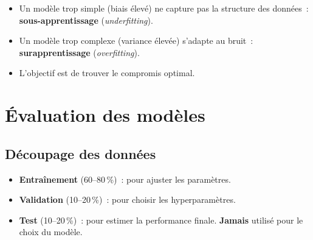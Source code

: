 \begin{center}
\end{center}

\begin{intuition}[title=\textbf{Interpr\'etation}]
\begin{itemize}
  \item Un mod\`ele trop simple (biais \'elev\'e) ne capture pas la
    structure des donn\'ees~: \textbf{sous-apprentissage} (\emph{underfitting}).
  \item Un mod\`ele trop complexe (variance \'elev\'ee) s'adapte au bruit~:
    \textbf{surapprentissage} (\emph{overfitting}).
  \item L'objectif est de trouver le compromis optimal.
\end{itemize}
\end{intuition}

\section{\'Evaluation des mod\`eles}
\label{sec:evaluation}

\subsection{D\'ecoupage des donn\'ees}

\begin{bonnepratique}[title=\textbf{Train / Validation / Test}]
\begin{itemize}
  \item \textbf{Entra\^inement} (60--80\,\%)~: pour ajuster les param\`etres.
  \item \textbf{Validation} (10--20\,\%)~: pour choisir les hyperparam\`etres.
  \item \textbf{Test} (10--20\,\%)~: pour estimer la performance finale.
    \textbf{Jamais} utilis\'e pour le choix du mod\`ele.
\end{itemize}
\end{bonnepratique}

